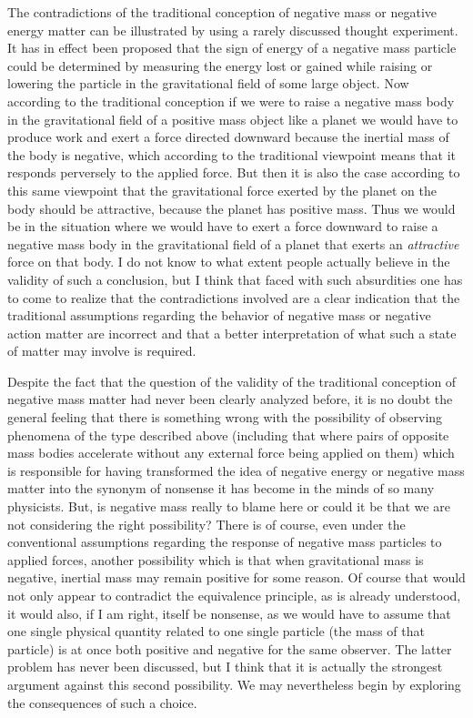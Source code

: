 \documentclass[notitlepage,12pt]{report}
\begin{document}
The contradictions of the traditional conception of negative mass or negative energy matter can be illustrated by using a rarely discussed thought experiment. It has in effect been proposed that the sign of energy of a negative mass particle could be determined by measuring the energy lost or gained while raising or lowering the particle in the gravitational field of some large object. Now according to the traditional conception if we were to raise a negative mass body in the gravitational field of a positive mass object like a planet we would have to produce work and exert a force directed downward because the inertial mass of the body is negative, which according to the traditional viewpoint means that it responds perversely to the applied force. But then it is also the case according to this same viewpoint that the gravitational force exerted by the planet on the body should be attractive, because the planet has positive mass. Thus we would be in the situation where we would have to exert a force downward to raise a negative mass body in the gravitational field of a planet that exerts an \textit{attractive} force on that body. I do not know to what extent people actually believe in the validity of such a conclusion, but I think that faced with such absurdities one has to come to realize that the contradictions involved are a clear indication that the traditional assumptions regarding the behavior of negative mass or negative action matter are incorrect and that a better interpretation of what such a state of matter may involve is required.

\bigskip

\noindent Despite the fact that the question of the validity of the traditional conception of negative mass matter had never been clearly analyzed before, it is no doubt the general feeling that there is something wrong with the possibility of observing phenomena of the type described above (including that where pairs of opposite mass bodies accelerate without any external force being applied on them) which is responsible for having transformed the idea of negative energy or negative mass matter into the synonym of nonsense it has become in the minds of so many physicists. But, is negative mass really to blame here or could it be that we are not considering the right possibility? There is of course, even under the conventional assumptions regarding the response of negative mass particles to applied forces, another possibility which is that when gravitational mass is negative, inertial mass may remain positive for some reason. Of course that would not only appear to contradict the equivalence principle, as is already understood, it would also, if I am right, itself be nonsense, as we would have to assume that one single physical quantity related to one single particle (the mass of that particle) is at once both positive and negative for the same observer. The latter problem has never been discussed, but I think that it is actually the strongest argument against this second possibility. We may nevertheless begin by exploring the consequences of such a choice.
\end{document}
